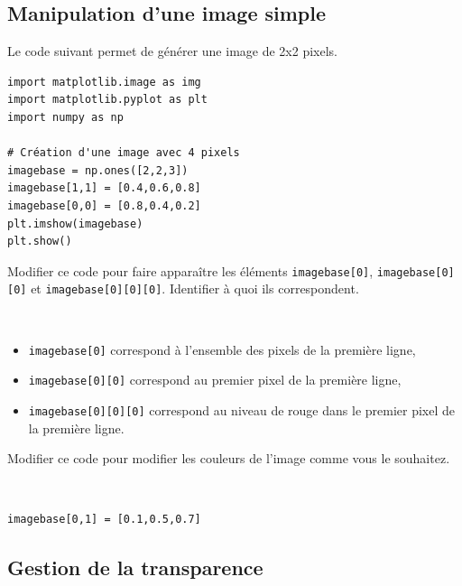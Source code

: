 \subsection{Manipulation d'une image simple}

Le code suivant permet de générer une image de 2x2 pixels.

\begin{verbatim}
import matplotlib.image as img
import matplotlib.pyplot as plt
import numpy as np

# Création d'une image avec 4 pixels
imagebase = np.ones([2,2,3])
imagebase[1,1] = [0.4,0.6,0.8]
imagebase[0,0] = [0.8,0.4,0.2]
plt.imshow(imagebase)
plt.show()
\end{verbatim}   

\begin{exercice}
Modifier ce code pour faire apparaître les éléments \verb?imagebase[0]?, \verb?imagebase[0][0]? et \verb?imagebase[0][0][0]?. Identifier à quoi ils correspondent.
\end{exercice}

\begin{solution}~\ 
\begin{itemize}
 \item \verb?imagebase[0]? correspond à l'ensemble des pixels de la première ligne,
 \item \verb?imagebase[0][0]? correspond au premier pixel de la première ligne,
 \item \verb?imagebase[0][0][0]? correspond au niveau de rouge dans le premier pixel de la première ligne.
\end{itemize}
\end{solution}

\begin{exercice}
Modifier ce code pour modifier les couleurs de l'image comme vous le souhaitez.
\end{exercice}

\begin{solution}~\\
\vspace{-0.7cm}
\begin{verbatim}
imagebase[0,1] = [0.1,0.5,0.7]
\end{verbatim} 
\end{solution}

\subsection{Gestion de la transparence}

